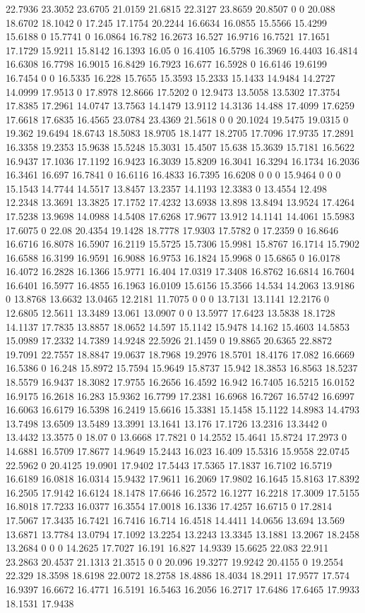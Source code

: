 22.7936 23.3052 23.6705 21.0159 21.6815 22.3127 23.8659 20.8507 0 0 20.088 18.6702 18.1042 0 17.245 17.1754 20.2244 16.6634 16.0855 15.5566 15.4299 15.6188 0 15.7741 0 16.0864 16.782 16.2673 16.527 16.9716 16.7521 17.1651 17.1729 15.9211 15.8142 16.1393 16.05 0 16.4105 16.5798 16.3969 16.4403 16.4814 16.6308 16.7798 16.9015 16.8429 16.7923 16.677 16.5928 0 16.6146 19.6199 16.7454 0 0 16.5335 16.228 15.7655 15.3593 15.2333 15.1433 14.9484 14.2727 14.0999 17.9513 0 17.8978 12.8666 17.5202 0 12.9473 13.5058 13.5302 17.3754 17.8385 17.2961 14.0747 13.7563 14.1479 13.9112 14.3136 14.488 17.4099 17.6259 17.6618 17.6835 16.4565 23.0784 23.4369 21.5618 0 0 20.1024 19.5475 19.0315 0 19.362 19.6494 18.6743 18.5083 18.9705 18.1477 18.2705 17.7096 17.9735 17.2891 16.3358 19.2353 15.9638 15.5248 15.3031 15.4507 15.638 15.3639 15.7181 16.5622 16.9437 17.1036 17.1192 16.9423 16.3039 15.8209 16.3041 16.3294 16.1734 16.2036 16.3461 16.697 16.7841 0 16.6116 16.4833 16.7395 16.6208 0 0 0 15.9464 0 0 0 15.1543 14.7744 14.5517 13.8457 13.2357 14.1193 12.3383 0 13.4554 12.498 12.2348 13.3691 13.3825 17.1752 17.4232 13.6938 13.898 13.8494 13.9524 17.4264 17.5238 13.9698 14.0988 14.5408 17.6268 17.9677 13.912 14.1141 14.4061 15.5983 17.6075 0 22.08 20.4354 19.1428 18.7778 17.9303 17.5782 0 17.2359 0 16.8646 16.6716 16.8078 16.5907 16.2119 15.5725 15.7306 15.9981 15.8767 16.1714 15.7902 16.6588 16.3199 16.9591 16.9088 16.9753 16.1824 15.9968 0 15.6865 0 16.0178 16.4072 16.2828 16.1366 15.9771 16.404 17.0319 17.3408 16.8762 16.6814 16.7604 16.6401 16.5977 16.4855 16.1963 16.0109 15.6156 15.3566 14.534 14.2063 13.9186 0 13.8768 13.6632 13.0465 12.2181 11.7075 0 0 0 13.7131 13.1141 12.2176 0 12.6805 12.5611 13.3489 13.061 13.0907 0 0 13.5977 17.6423 13.5838 18.1728 14.1137 17.7835 13.8857 18.0652 14.597 15.1142 15.9478 14.162 15.4603 14.5853 15.0989 17.2332 14.7389 14.9248 22.5926 21.1459 0 19.8865 20.6365 22.8872 19.7091 22.7557 18.8847 19.0637 18.7968 19.2976 18.5701 18.4176 17.082 16.6669 16.5386 0 16.248 15.8972 15.7594 15.9649 15.8737 15.942 18.3853 16.8563 18.5237 18.5579 16.9437 18.3082 17.9755 16.2656 16.4592 16.942 16.7405 16.5215 16.0152 16.9175 16.2618 16.283 15.9362 16.7799 17.2381 16.6968 16.7267 16.5742 16.6997 16.6063 16.6179 16.5398 16.2419 15.6616 15.3381 15.1458 15.1122 14.8983 14.4793 13.7498 13.6509 13.5489 13.3991 13.1641 13.176 17.1726 13.2316 13.3442 0 13.4432 13.3575 0 18.07 0 13.6668 17.7821 0 14.2552 15.4641 15.8724 17.2973 0 14.6881 16.5709 17.8677 14.9649 15.2443 16.023 16.409 15.5316 15.9558 22.0745 22.5962 0 20.4125 19.0901 17.9402 17.5443 17.5365 17.1837 16.7102 16.5719 16.6189 16.0818 16.0314 15.9432 17.9611 16.2069 17.9802 16.1645 15.8163 17.8392 16.2505 17.9142 16.6124 18.1478 17.6646 16.2572 16.1277 16.2218 17.3009 17.5155 16.8018 17.7233 16.0377 16.3554 17.0018 16.1336 17.4257 16.6715 0 17.2814 17.5067 17.3435 16.7421 16.7416 16.714 16.4518 14.4411 14.0656 13.694 13.569 13.6871 13.7784 13.0794 17.1092 13.2254 13.2243 13.3345 13.1881 13.2067 18.2458 13.2684 0 0 0 14.2625 17.7027 16.191 16.827 14.9339 15.6625 22.083 22.911 23.2863 20.4537 21.1313 21.3515 0 0 20.096 19.3277 19.9242 20.4155 0 19.2554 22.329 18.3598 18.6198 22.0072 18.2758 18.4886 18.4034 18.2911 17.9577 17.574 16.9397 16.6672 16.4771 16.5191 16.5463 16.2056 16.2717 17.6486 17.6465 17.9933 18.1531 17.9438 